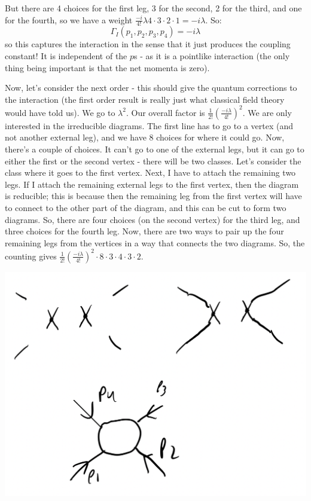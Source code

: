 But there are 4 choices for the first leg, 3 for the second, 2 for the third, and one for the fourth, so we have a weight $\frac{-i}{4!}\lambda 4 \cdot 3 \cdot 2 \cdot 1 = -i\lambda$. So:
\begin{equation}
    \Gamma_I(p_1, p_2, p_3, p_4) = -i\lambda
\end{equation}
so this captures the interaction in the sense that it just produces the coupling constant! It is independent of the $p$s - as it is a pointlike interaction (the only thing being important is that the net momenta is zero).

Now, let's consider the next order - this should give the quantum corrections to the interaction (the first order result is really just what classical field theory would have told us). We go to $\lambda^2$. Our overall factor is $\frac{1}{2!}\left(\frac{-i\lambda}{4!}\right)^2$. We are only interested in the irreducible diagrams. The first line has to go to a vertex (and not another external leg), and we have $8$ choices for where it could go. Now, there's a couple of choices. It can't go to one of the external legs, but it can go to either the first or the second vertex - there will be two classes. Let's consider the class where it goes to the first vertex. Next, I have to attach the remaining two legs. If I attach the remaining external legs to the first vertex, then the diagram is reducible; this is because then the remaining leg from the first vertex will have to connect to the other part of the diagram, and this can be cut to form two diagrams. So, there are four choices (on the second vertex) for the third leg, and three choices for the fourth leg. Now, there are two ways to pair up the four remaining legs from the vertices in a way that connects the two diagrams. So, the counting gives $\frac{1}{2!}\left(\frac{-i\lambda}{4!}\right)^2 \cdot 8 \cdot 3 \cdot 4 \cdot 3 \cdot 2$.

\begin{center}
\includegraphics[scale=0.3]{Images/fig-lec28feynman7.png}
\end{center}

